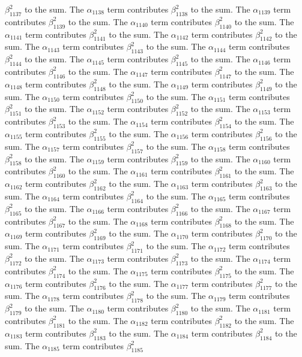 \begin{lemma}
$\beta_{1137}^{2}$ to the sum. The $\alpha_{1138}$ term contributes $\beta_{1138}^{2}$ to the sum. The $\alpha_{1139}$ term contributes $\beta_{1139}^{2}$ to the sum. The $\alpha_{1140}$ term contributes $\beta_{1140}^{2}$ to the sum. The $\alpha_{1141}$ term contributes $\beta_{1141}^{2}$ to the sum. The $\alpha_{1142}$ term contributes $\beta_{1142}^{2}$ to the sum. The $\alpha_{1143}$ term contributes $\beta_{1143}^{2}$ to the sum. The $\alpha_{1144}$ term contributes $\beta_{1144}^{2}$ to the sum. The $\alpha_{1145}$ term contributes $\beta_{1145}^{2}$ to the sum. The $\alpha_{1146}$ term contributes $\beta_{1146}^{2}$ to the sum. The $\alpha_{1147}$ term contributes $\beta_{1147}^{2}$ to the sum. The $\alpha_{1148}$ term contributes $\beta_{1148}^{2}$ to the sum. The $\alpha_{1149}$ term contributes $\beta_{1149}^{2}$ to the sum. The $\alpha_{1150}$ term contributes $\beta_{1150}^{2}$ to the sum. The $\alpha_{1151}$ term contributes $\beta_{1151}^{2}$ to the sum. The $\alpha_{1152}$ term contributes $\beta_{1152}^{2}$ to the sum. The $\alpha_{1153}$ term contributes $\beta_{1153}^{2}$ to the sum. The $\alpha_{1154}$ term contributes $\beta_{1154}^{2}$ to the sum. The $\alpha_{1155}$ term contributes $\beta_{1155}^{2}$ to the sum. The $\alpha_{1156}$ term contributes $\beta_{1156}^{2}$ to the sum. The $\alpha_{1157}$ term contributes $\beta_{1157}^{2}$ to the sum. The $\alpha_{1158}$ term contributes $\beta_{1158}^{2}$ to the sum. The $\alpha_{1159}$ term contributes $\beta_{1159}^{2}$ to the sum. The $\alpha_{1160}$ term contributes $\beta_{1160}^{2}$ to the sum. The $\alpha_{1161}$ term contributes $\beta_{1161}^{2}$ to the sum. The $\alpha_{1162}$ term contributes $\beta_{1162}^{2}$ to the sum. The $\alpha_{1163}$ term contributes $\beta_{1163}^{2}$ to the sum. The $\alpha_{1164}$ term contributes $\beta_{1164}^{2}$ to the sum. The $\alpha_{1165}$ term contributes $\beta_{1165}^{2}$ to the sum. The $\alpha_{1166}$ term contributes $\beta_{1166}^{2}$ to the sum. The $\alpha_{1167}$ term contributes $\beta_{1167}^{2}$ to the sum. The $\alpha_{1168}$ term contributes $\beta_{1168}^{2}$ to the sum. The $\alpha_{1169}$ term contributes $\beta_{1169}^{2}$ to the sum. The $\alpha_{1170}$ term contributes $\beta_{1170}^{2}$ to the sum. The $\alpha_{1171}$ term contributes $\beta_{1171}^{2}$ to the sum. The $\alpha_{1172}$ term contributes $\beta_{1172}^{2}$ to the sum. The $\alpha_{1173}$ term contributes $\beta_{1173}^{2}$ to the sum. The $\alpha_{1174}$ term contributes $\beta_{1174}^{2}$ to the sum. The $\alpha_{1175}$ term contributes $\beta_{1175}^{2}$ to the sum. The $\alpha_{1176}$ term contributes $\beta_{1176}^{2}$ to the sum. The $\alpha_{1177}$ term contributes $\beta_{1177}^{2}$ to the sum. The $\alpha_{1178}$ term contributes $\beta_{1178}^{2}$ to the sum. The $\alpha_{1179}$ term contributes $\beta_{1179}^{2}$ to the sum. The $\alpha_{1180}$ term contributes $\beta_{1180}^{2}$ to the sum. The $\alpha_{1181}$ term contributes $\beta_{1181}^{2}$ to the sum. The $\alpha_{1182}$ term contributes $\beta_{1182}^{2}$ to the sum. The $\alpha_{1183}$ term contributes $\beta_{1183}^{2}$ to the sum. The $\alpha_{1184}$ term contributes $\beta_{1184}^{2}$ to the sum. The $\alpha_{1185}$ term contributes $\beta_{1185}^{2}$ 
\end{lemma}
